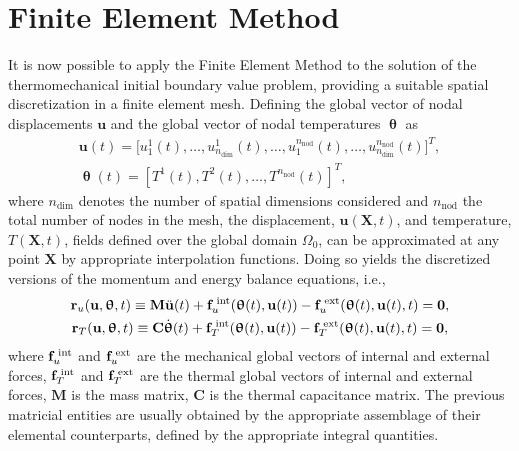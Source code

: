 \section{Finite Element Method} \label{sec:fem_mech}

It is now possible to apply the Finite Element Method to the solution of the thermomechanical initial boundary value problem, providing a suitable spatial discretization in a finite element mesh.
Defining the global vector of nodal displacements \(\mathbf{u}\) and the global vector of nodal temperatures \(\bm{\uptheta}\) as
\begin{gather}
  \mathbf{u}(t) = \Big[ u_1^1(t),\dots,u^1_{n_\text{dim}}(t),\dots, u_1^{n_\text{nod}}(t),\dots,u^{n_\text{nod}}_{n_\text{dim}}(t)\Big]^T,\\
  \bm{\uptheta}(t) = \left[ T^1(t), T^2(t), \dots, T^{n_\text{nod}}(t)\right]^T,
\end{gather}
where \(n_\text{dim}\) denotes the number of spatial dimensions considered and \(n_\text{nod}\) the total number of nodes in the mesh, the displacement, $\bm{u}(\bm{X}, t)$, and temperature, \(T(\bm{X}, t)\), fields defined over the global domain $\Omega_0$, can be approximated at any point $\bm{X}$ by appropriate interpolation functions.
Doing so yields the discretized versions of the momentum and energy balance equations, i.e.,
\begin{gather}
  \mathbf{r}_{u}(\mathbf{u}, \bm{\uptheta}, t)\equiv\mathbf{M} \ddot{\mathbf{u}}(t) +\mathbf{f}_u^\text{\;int}(\bm{\uptheta}(t), \mathbf{u}(t))-\mathbf{f}^\text{\;ext}_{u}(\bm{\uptheta}(t), \mathbf{u}(t), t)=\mathbf{0}, \label{eq:disc_momentum_balance} \\
  \mathbf{r}_{T}(\mathbf{u}, \bm{\uptheta}, t)\equiv \mathbf{C} \dot{\bm{\uptheta}}(t)  + \mathbf{f}_T^\text{\;int}(\bm{\uptheta}(t), \mathbf{u}(t))-\mathbf{f}^\text{\;ext}_{T}(\bm{\uptheta}(t), \mathbf{u}(t), t)=\mathbf{0}, \label{eq:disc_energy_balance}
\end{gather}
where $\mathbf{f}_u^\text{\;int}$ and $\mathbf{f}^\text{\;ext}_{u}$ are the mechanical global vectors of internal and external forces, $\mathbf{f}_T^\text{\;int}$ and $\mathbf{f}^\text{\;ext}_{T}$ are the thermal global vectors of internal and external forces, $\mathbf{M}$ is the mass matrix, \(\mathbf{C}\) is the thermal capacitance matrix.
The previous matricial entities are usually obtained by the appropriate assemblage of their elemental counterparts, defined by the appropriate integral quantities.


